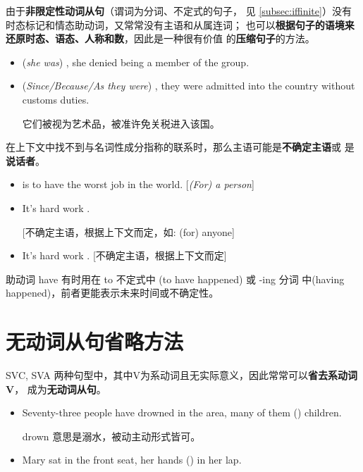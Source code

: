 由于\textbf{非限定性动词从句}（谓词为分词、不定式的句子，
见 \cref{subsec:iffinite}）没有时态标记和情态助动词，又常常没有主语和从属连词；
也可以\textbf{根据句子的语境来还原时态、语态、人称和数}，因此是一种很有价值
的\textbf{压缩句子}的方法。

\begin{itemize}
\item {} (\emph{she was}) , she denied being a member of the group.
\item (\emph{Since/Because/As they were}) , they were
  admitted into the country without customs duties.

  它们被视为艺术品，被准许免关税进入该国。
\end{itemize}

在上下文中找不到与名词性成分指称的联系时，那么主语可能是\textbf{不确定主语}或
是\textbf{说话者}。
\begin{itemize}
\item {} is to have the worst job in the
  world. [\emph{(For) a person}]
\item It's hard work .

  [不确定主语，根据上下文而定，如: (for) anyone]
\item It's hard work . [不确定主语，根据上下文而定]
\end{itemize}

助动词 have 有时用在 to 不定式中 (to have happened) 或 -ing 分词
中(having happened)，前者更能表示未来时间或不确定性。

\section{无动词从句省略方法}

SVC, SVA 两种句型中，其中V为系动词且无实际意义，因此常常可以\textbf{省去系动词V}，
成为\textbf{无动词从句}。

\begin{itemize}
\item Seventy-three people have drowned in the area, many of them
  () children.

  drown 意思是溺水，被动主动形式皆可。

\item  Mary sat in the front seat, her hands () in her lap.
\end{itemize}

